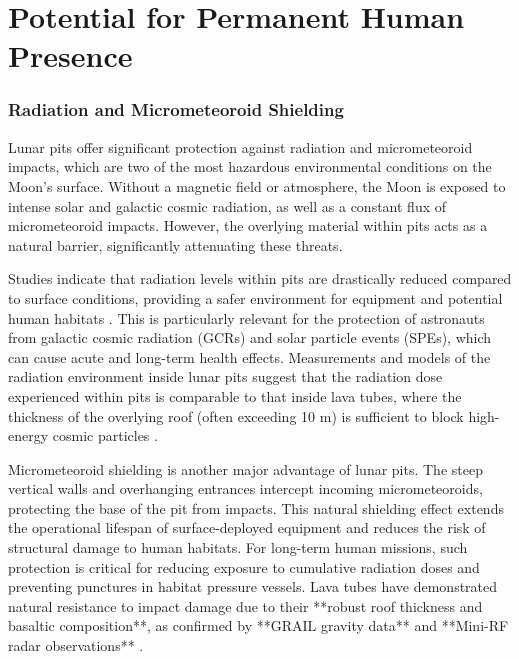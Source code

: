 \graphicspath{{img/ch6}}

\section{Potential for Permanent Human Presence}

\subsubsection{Radiation and Micrometeoroid Shielding}

Lunar pits offer significant protection against radiation and micrometeoroid impacts, which are two of the most hazardous environmental conditions on the Moon's surface. Without a magnetic field or atmosphere, the Moon is exposed to intense solar and galactic cosmic radiation, as well as a constant flux of micrometeoroid impacts. However, the overlying material within pits acts as a natural barrier, significantly attenuating these threats. 

Studies indicate that radiation levels within pits are drastically reduced compared to surface conditions, providing a safer environment for equipment and potential human habitats \cite{thermal-lunar-pits, newer-thermal}. This is particularly relevant for the protection of astronauts from galactic cosmic radiation (GCRs) and solar particle events (SPEs), which can cause acute and long-term health effects. Measurements and models of the radiation environment inside lunar pits suggest that the radiation dose experienced within pits is comparable to that inside lava tubes, where the thickness of the overlying roof (often exceeding 10 m) is sufficient to block high-energy cosmic particles \cite{bases-feng}.

Micrometeoroid shielding is another major advantage of lunar pits. The steep vertical walls and overhanging entrances intercept incoming micrometeoroids, protecting the base of the pit from impacts. This natural shielding effect extends the operational lifespan of surface-deployed equipment and reduces the risk of structural damage to human habitats. For long-term human missions, such protection is critical for reducing exposure to cumulative radiation doses and preventing punctures in habitat pressure vessels. Lava tubes have demonstrated natural resistance to impact damage due to their **robust roof thickness and basaltic composition**, as confirmed by **GRAIL gravity data** and **Mini-RF radar observations** \cite{bases-feng, Carrer2024}.

